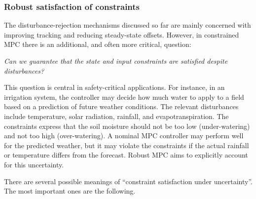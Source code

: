 \subsubsection{Robust satisfaction of constraints}

The disturbance-rejection mechanisms discussed so far are mainly concerned with improving
tracking and reducing steady-state offsets. However, in constrained MPC there is an additional,
and often more critical, question:

\begin{center}
\emph{Can we guarantee that the state and input constraints are satisfied despite disturbances?}
\end{center}

This question is central in safety-critical applications. For instance, in an irrigation system,
the controller may decide how much water to apply to a field based on a prediction of future
weather conditions. The relevant disturbances include temperature, solar radiation, rainfall,
and evapotranspiration. The constraints express that the soil moisture should not be too low
(under-watering) and not too high (over-watering). A nominal MPC controller may perform well
for the predicted weather, but it may violate the constraints if the actual rainfall or temperature
differs from the forecast. Robust MPC aims to explicitly account for this uncertainty.

There are several possible meanings of ``constraint satisfaction under uncertainty''. The most
important ones are the following.


